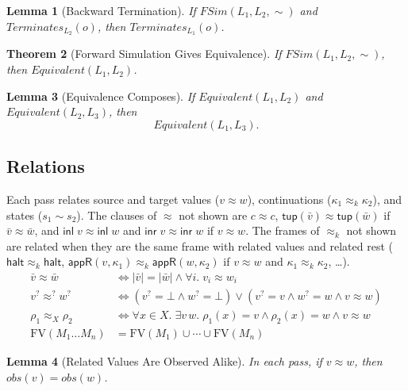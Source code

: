 \documentclass[10pt]{article}
\theoremstyle{acmplain}
\newtheorem{theorem}{Theorem}[section]
\newtheorem{lemma}[theorem]{Lemma}
\newcommand{\key}[1]{\mathsf{#1}}
\newcommand{\FV}{\mathrm{FV}}
\newcommand{\obs}{\mathit{obs}}
\newcommand{\Term}{\mathit{Terminates}}
\newcommand{\Equiv}{\mathit{Equivalent}}
\newcommand{\FSim}{\mathit{FSim}}
\newcommand{\tupV}[1]{\key{tup}(#1)}
\newcommand{\inlV}{\key{inl}\;}
\newcommand{\inrV}{\key{inr}\;}
\newcommand{\Kf}[2]{\key{#1}(#2)}
\newcommand{\halt}{\key{halt}}
\newcommand{\approxk}{\approx_k}
\newcommand{\approxq}{\approx^{?}}
\begin{document}
\begin{lemma}[Backward Termination]\label{lem:bwd-term}
If $\FSim(L_1, L_2, \sim)$ and $\Term_{L_2}(o)$, then $\Term_{L_1}(o)$.
\end{lemma}

\begin{theorem}[Forward Simulation Gives Equivalence]\label{thm:equivalent}
If $\FSim(L_1, L_2, \sim)$, then $\Equiv(L_1, L_2)$.
\end{theorem}

\begin{lemma}[Equivalence Composes]\label{lem:equiv-trans}
If $\Equiv(L_1, L_2)$ and $\Equiv(L_2, L_3)$, then
\[
  \Equiv(L_1, L_3) .
\]
\end{lemma}

\subsection{Relations}\label{sec:sim-relations}

Each pass relates source and target values ($v \approx w$), continuations
($\kappa_1 \approxk \kappa_2$), and states ($s_1 \sim s_2$).
The clauses of $\approx$ not shown are
$c \approx c$, $\tupV{\bar{v}} \approx \tupV{\bar{w}}$ if $\bar{v} \approx \bar{w}$,
and $\inlV v \approx \inlV w$ and $\inrV v \approx \inrV w$ if $v \approx w$.
The frames of $\approxk$ not shown are related when they are the same frame
with related values and related rest ($\halt \approxk \halt$,
$\Kf{appR}{v, \kappa_1} \approxk \Kf{appR}{w, \kappa_2}$ if $v \approx w$ and
$\kappa_1 \approxk \kappa_2$, \ldots).
\begin{align*}
  \bar{v} \approx \bar{w} &\iff |\bar{v}| = |\bar{w}| \land \forall i.\; v_i \approx w_i \\
  v^? \approxq w^? &\iff (v^? = \bot \land w^? = \bot) \lor (v^? = v \land w^? = w \land v \approx w) \\
  \rho_1 \approx_X \rho_2 &\iff \forall x \in X.\; \exists v\, w.\;
    \rho_1(x) = v \land \rho_2(x) = w \land v \approx w \\
  \FV(M_1 \ldots M_n) &= \FV(M_1) \cup \cdots \cup \FV(M_n)
\end{align*}

\begin{lemma}[Related Values Are Observed Alike]\label{lem:obs}
In each pass, if $v \approx w$, then $\obs(v) = \obs(w)$.
\end{lemma}
\end{document}
